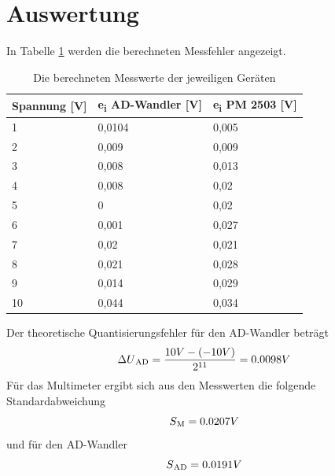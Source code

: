 \documentclass[12pt, oneside, a4paper, \docLanguage]{report}
\begin{document}
\section{Auswertung}
\label{chap:VERSUCH_1_AUSWERTUNG}
In Tabelle \ref{fig:VERSUCH_1_auswertung} werden die berechneten Messfehler angezeigt.
\begin{table}[H]
\centering
\begin{tabular}{|l|l|l|}
\hline
\multicolumn{1}{|c|}{\textbf{Spannung {[}V{]}}} & \textbf{e\textsubscript{i} AD-Wandler {[}V{]}} & \textbf{e\textsubscript{i} PM 2503 {[}V{]}} \\ \hline
1                                               & 0,0104                         & 0,005                       \\ \hline
2                                               & 0,009                          & 0,009                       \\ \hline
3                                               & 0,008                          & 0,013                       \\ \hline
4                                               & 0,008                          & 0,02                        \\ \hline
5                                               & 0                              & 0,02                        \\ \hline
6                                               & 0,001                          & 0,027                       \\ \hline
7                                               & 0,02                           & 0,021                       \\ \hline
8                                               & 0,021                          & 0,028                       \\ \hline
9                                               & 0,014                          & 0,029                       \\ \hline
10                                              & 0,044                          & 0,034                       \\ \hline
\end{tabular}
\caption{Die berechneten Messwerte der jeweiligen Geräten}
\label{fig:VERSUCH_1_auswertung}
\end{table}
Der theoretische Quantisierungsfehler für den AD-Wandler beträgt
\begin{equation*}
\Delta U\textsubscript{AD} = \frac{10V - (-10V)}{2\textsuperscript{11}} = 0.0098V
\end{equation*}
Für das Multimeter ergibt sich aus den Messwerten die folgende Standardabweichung
\begin{equation*}
S\textsubscript{M} = 0.0207V
\end{equation*}
und für den AD-Wandler
\begin{equation*}
S\textsubscript{AD} = 0.0191V
\end{equation*}
\end{document}
